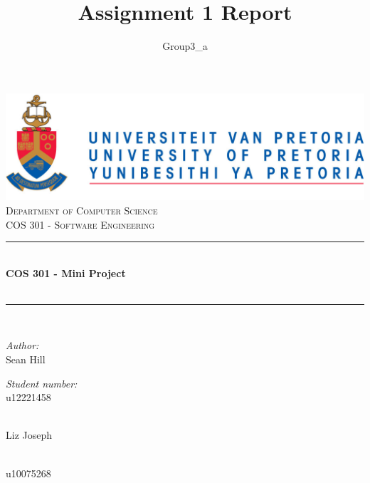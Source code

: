\documentclass[a4paper,12pt]{report}
\author{Group3_a}
\title{ Assignment 1 Report}
\newcommand{\HRule}{\rule{\linewidth}{0.5mm}}
\begin{document}
\setlength{\parskip}{6pt}

\begin{titlepage}

\begin{center}
\includegraphics[width=1\textwidth]{./University_of_Pretoria_Logo.PNG}\\[0.4cm]    
\textsc{\LARGE Department of Computer Science}\\[1.5cm]
\textsc{\Large COS 301 - Software Engineering}\\[0.5cm]
\HRule \\[0.4cm]
{ \huge \bfseries COS 301 - Mini Project}\\[0.4cm]\
\HRule \\[0.4cm]
\begin{minipage}{0.4\textwidth}
\begin{flushleft} \large
\emph{Author:}\\
Sean {Hill}
\end{flushleft}
\end{minipage}
\begin{minipage}{0.4\textwidth}
\begin{flushright} \large
\emph{Student number:} \\
u12221458
\end{flushright}
\end{minipage}
\begin{minipage}{0.4\textwidth}
\begin{flushleft} \large
\emph{} \\
Liz {Joseph}
\end{flushleft}
\end{minipage}
\begin{minipage}{0.4\textwidth}
\begin{flushright} \large
\emph{} \\
u10075268
\end{flushright}
\end{minipage}
\begin{minipage}{0.4\textwidth}
\begin{flushleft} \large

\end{flushleft}
\end{minipage}
\end{center}
\end{titlepage}
\end{document}

